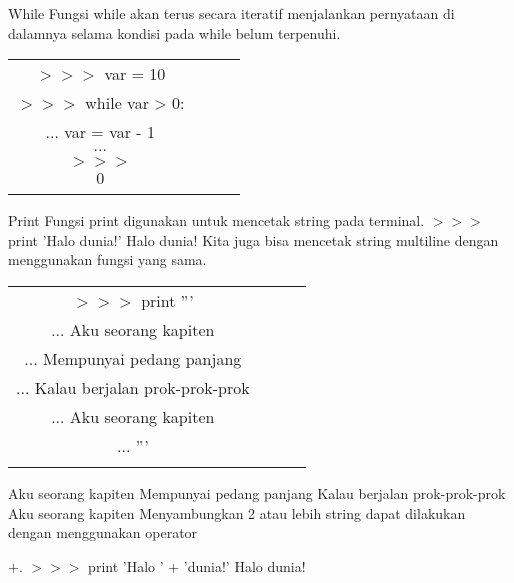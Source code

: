 While
Fungsi while akan terus secara iteratif menjalankan pernyataan di dalamnya selama kondisi pada while belum terpenuhi.




\begin{tabular}{|c|c|c|c|}
\hline

$>>>$ var = 10 \\ \linebreak
$>>>$ while var > 0: \\ \linebreak
$...$ 	var = var - 1 \\ \linebreak
$...$ \\ \linebreak
$>>>$ \\ \linebreak
$0$ \\ \linebreak

\end{tabular}


Print
Fungsi print digunakan untuk mencetak string pada terminal.
$>>>$ print 'Halo dunia!'
Halo dunia!
Kita juga bisa mencetak string multiline dengan menggunakan fungsi yang sama.


\begin{tabular}{|c|c|c|c|}
\hline

$>>>$ print ''' \\ \linebreak
$...$ Aku seorang kapiten \\ \linebreak
$...$ Mempunyai pedang panjang \\ \linebreak
$...$ Kalau berjalan prok-prok-prok \\ \linebreak
$...$ Aku seorang kapiten \\ \linebreak
$...$ ''' \\ \linebreak

\end{tabular}



Aku seorang kapiten
Mempunyai pedang panjang
Kalau berjalan prok-prok-prok
Aku seorang kapiten
Menyambungkan 2 atau lebih string dapat dilakukan dengan menggunakan operator 

$+.$
$>>>$ print 'Halo ' + 'dunia!'
Halo dunia!

